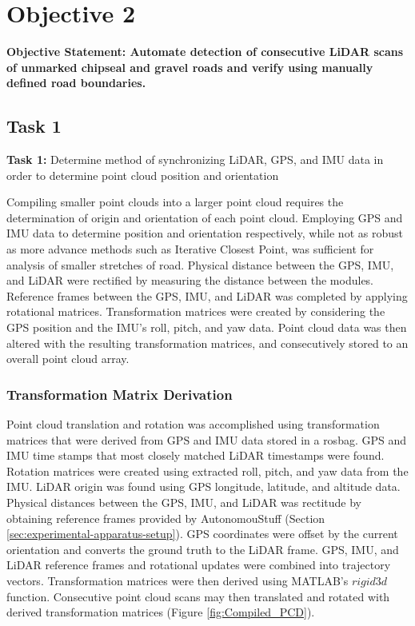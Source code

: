 \documentclass[numbered,pdftex]{ohio-etd}
\begin{document}
{{{{			} %
			
				
		} %

	} %


\newpage
	
	\section{Objective 2}\label{sec:objective-2}
	
		{
		
		\textbf{Objective Statement: Automate detection of consecutive LiDAR scans of unmarked chipseal and gravel roads and verify using manually defined road boundaries.}
		
		\subsection{Task 1}{
		
			\textbf{Task 1: }{Determine method of synchronizing LiDAR, GPS, and IMU data in order to determine point cloud position and orientation}
		
				{Compiling smaller point clouds into a larger point cloud requires the determination of origin and orientation of each point cloud. Employing GPS and IMU data to determine position and orientation respectively, while not as robust as more advance methods such as Iterative Closest Point, was sufficient for analysis of smaller stretches of road. Physical distance between the GPS, IMU, and LiDAR were rectified by measuring the distance between the modules. Reference frames between the GPS, IMU, and LiDAR was completed by applying rotational matrices. Transformation matrices were created by considering the GPS position and the IMU's roll, pitch, and yaw data. Point cloud data was then altered with the resulting transformation matrices, and consecutively stored to an overall point cloud array.}
			
			\subsubsection{Transformation Matrix Derivation} \label{sec:grab_tform} {
			
				{Point cloud translation and rotation was accomplished using transformation matrices that were derived from GPS and IMU data stored in a rosbag. GPS and IMU  time stamps that most closely matched LiDAR timestamps were found. Rotation matrices were created using extracted roll, pitch, and yaw data from the IMU. LiDAR origin was found using GPS longitude, latitude, and altitude data. Physical distances between the GPS, IMU, and LiDAR was rectitude by obtaining reference frames provided by AutonomouStuff (Section \ref{sec:experimental-apparatus-setup}). GPS coordinates were offset by the current orientation and converts the ground truth to the LiDAR frame. GPS, IMU, and LiDAR reference frames and rotational updates were combined into trajectory vectors. Transformation matrices were then derived using MATLAB's $rigid3d$ function. Consecutive point cloud scans may then translated and rotated with derived transformation matrices (Figure \ref{fig:Compiled_PCD}).}
				

}}}}
\end{document}
